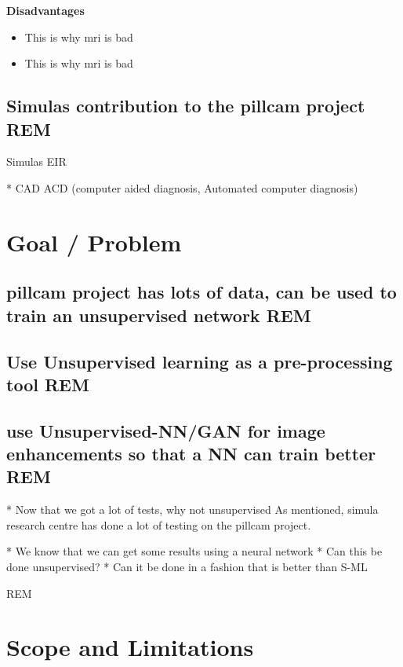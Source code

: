 	\vspace{5px}
	\textbf{Disadvantages}
	  \begin{itemize}
	    \item This is why mri is bad %
	    \item This is why mri is bad %
	  \end{itemize}
 
	
	
    \vspace{10px}

  \subsection{Simulas contribution to the pillcam project REM}
    Simulas EIR
		

		
    * CAD ACD (computer aided diagnosis, Automated computer diagnosis)

    \vspace{10px}
	
\section{Goal / Problem}
  \subsection{pillcam project has lots of data, can be used to train an unsupervised network REM}
  \subsection{Use Unsupervised learning as a pre-processing tool REM}
  \subsection{use Unsupervised-NN/GAN for image enhancements so that a NN can train better REM}
    * Now that we got a lot of tests, why not unsupervised
    As mentioned, simula research centre has done a lot of testing on the pillcam project.
		  
		* We know that we can get some results using a neural network
		* Can this be done unsupervised?
		* Can it be done in a fashion that is better than S-ML
		 
		 REM

		
\section{Scope and Limitations}
